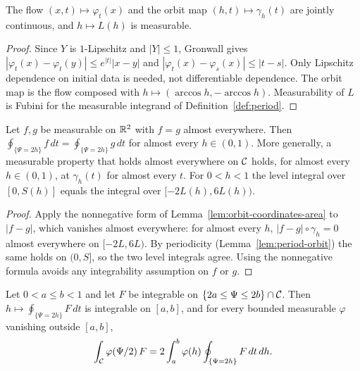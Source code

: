 \begin{lemma}
\label{lem:flow-continuity}
\leanok
The flow $(x,t)\mapsto\varphi_t(x)$ and the orbit map $(h,t)\mapsto\gamma_h(t)$ are jointly
continuous, and $h\mapsto L(h)$ is measurable.
\end{lemma}

\begin{proof}
\leanok
Since $Y$ is $1$-Lipschitz and $|Y|\le1$, Gronwall gives
$|\varphi_t(x)-\varphi_t(y)|\le e^{|t|}|x-y|$ and $|\varphi_t(x)-\varphi_s(x)|\le|t-s|$.
Only Lipschitz dependence on initial data is needed, not differentiable dependence.
The orbit map is the flow composed with $h\mapsto(\arccos h,-\arccos h)$. Measurability
of $L$ is Fubini for the measurable integrand of Definition~\ref{def:period}.
\end{proof}

\begin{lemma}
\label{lem:level-integral-congr}
\leanok
Let $f,g$ be measurable on $\mathbb{R}^2$ with $f=g$ almost everywhere. Then
$\oint_{\{\Psi=2h\}}f\,dt=\oint_{\{\Psi=2h\}}g\,dt$ for almost every $h\in(0,1)$. More
generally, a measurable property that holds almost everywhere on $\mathcal{C}$ holds, for almost
every $h\in(0,1)$, at $\gamma_h(t)$ for almost every $t$. For $0<h<1$ the level integral over
$[0,S(h)]$ equals the integral over $[-2L(h),6L(h))$.
\end{lemma}

\begin{proof}
\leanok
Apply the nonnegative form of Lemma~\ref{lem:orbit-coordinates-area} to $|f-g|$, which
vanishes almost everywhere: for almost every $h$, $|f-g|\circ\gamma_h=0$ almost everywhere
on $[-2L,6L)$. By periodicity (Lemma~\ref{lem:period-orbit}) the same holds on $(0,S]$,
so the two level integrals agree. Using the nonnegative formula avoids any integrability
assumption on $f$ or $g$.
\end{proof}

\begin{lemma}
\label{lem:coarea-level-cutoff}
\leanok
Let $0<a\le b<1$ and let $F$ be integrable on $\{2a\le\Psi\le2b\}\cap\mathcal{C}$. Then
$h\mapsto\oint_{\{\Psi=2h\}}F\,dt$ is integrable on $[a,b]$, and for every bounded measurable
$\varphi$ vanishing outside $[a,b]$,
\[
  \int_{\mathcal{C}}\varphi(\Psi/2)\,F=2\int_a^b\varphi(h)\oint_{\{\Psi=2h\}}F\,dt\,dh .
\]
\end{lemma}

